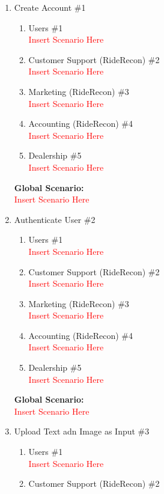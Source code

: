 \documentclass[]{article}
\begin{document}
\begin{enumerate}[label={\bf BE\arabic*.}]
	\item Create Account \#1
		\begin{enumerate}[label=\textbf{VP\arabic*.}]
			\item Users \#1 \\
				\textcolor{red}{Insert Scenario Here}
			\item Customer Support (RideRecon) \#2 \\
				\textcolor{red}{Insert Scenario Here}
			\item Marketing (RideRecon) \#3 \\
				\textcolor{red}{Insert Scenario Here}
			\item Accounting (RideRecon) \#4 \\
				\textcolor{red}{Insert Scenario Here}
			\item Dealership \#5 \\
				\textcolor{red}{Insert Scenario Here}
		\end{enumerate}
		{\bf Global Scenario:}\\
		\textcolor{red}{Insert Scenario Here}
	\item Authenticate User \#2
	\begin{enumerate}[label={\bf VP\arabic*.}]
		\item Users \#1 \\
			\textcolor{red}{Insert Scenario Here}
		\item Customer Support (RideRecon) \#2 \\
			\textcolor{red}{Insert Scenario Here}
		\item Marketing (RideRecon) \#3 \\
			\textcolor{red}{Insert Scenario Here}
		\item Accounting (RideRecon) \#4 \\
			\textcolor{red}{Insert Scenario Here}
		\item Dealership \#5 \\
			\textcolor{red}{Insert Scenario Here}
	\end{enumerate}
	{\bf Global Scenario:}\\
	\textcolor{red}{Insert Scenario Here}
	\item Upload Text adn Image as Input \#3
		\begin{enumerate}[label=\textbf{VP\arabic*.}]
			\item Users \#1 \\
				\textcolor{red}{Insert Scenario Here}
			\item Customer Support (RideRecon) \#2 \\

\end{enumerate}
\end{enumerate}
\end{document}

